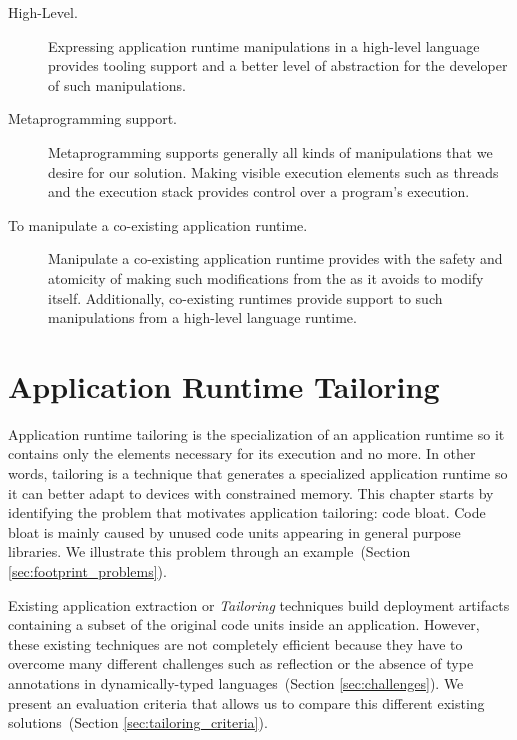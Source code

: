 \begin{description}

\item[High-Level.] Expressing application runtime manipulations in a high-level language provides tooling support and a better level of abstraction for the developer of such manipulations. 

\item[Metaprogramming support.] Metaprogramming supports generally all kinds of manipulations that we desire for our solution. Making visible execution elements such as threads and the execution stack provides control over a program's execution.

\item[To manipulate a co-existing application runtime.] Manipulate a co-existing application runtime provides with the safety and atomicity of making such modifications from the \VM as it avoids to modify itself. Additionally, co-existing runtimes provide support to such manipulations from a high-level language runtime.

\end{description}


\chapter{Application Runtime Tailoring}
\minitoc

Application runtime tailoring is the specialization of an application runtime so it contains only the elements necessary for its execution and no more. In other words, tailoring is a technique that generates a specialized application runtime so it can better adapt to devices with constrained memory.
This chapter starts by identifying the problem that motivates application tailoring: code bloat. Code bloat is mainly caused by unused code units appearing in general purpose libraries.
We illustrate this problem through an example~(Section \ref{sec:footprint_problems}).

Existing application extraction or \emph{Tailoring} techniques build deployment artifacts containing a subset of the original code units inside an application. However, these existing techniques are not completely efficient because they have to overcome many different challenges such as reflection or the absence of type annotations in dynamically-typed languages~(Section \ref{sec:challenges}). We present an evaluation criteria that allows us to compare this different existing solutions~(Section \ref{sec:tailoring_criteria}).

